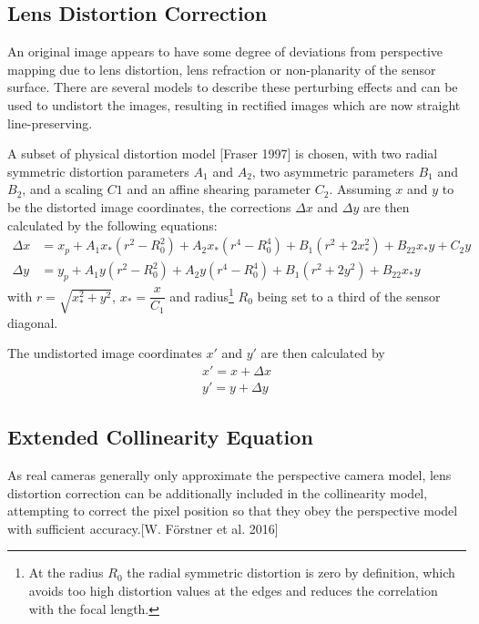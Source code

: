 \subsection{Lens Distortion Correction}
\label{subsec:LensDistortion}

An original image appears to have some degree of deviations from perspective mapping due to lens distortion, lens refraction or non-planarity of the sensor surface. There are several models to describe these perturbing effects and can be used to undistort the images, resulting in rectified images which are now straight line-preserving.
 
A subset of physical distortion model [Fraser 1997] is chosen, with two radial symmetric distortion parameters $A_1$ and $A_2$, two asymmetric parameters $B_1$ and $B_2$, and a scaling $C1$ and an affine shearing parameter $C_2$. Assuming $x$ and $y$ to be the distorted image coordinates, the corrections $\Delta x$ and $\Delta y$ are then calculated by the following equations:
\begin{equation} \label{eq:LensDistortion}
\begin{split}
\Delta x &= x_p + A_1x_*(r^2-R_0^2) + A_2x_*(r^4-R_0^4) + B_1(r^2+2x_*^2) + B_22x_*y+C_2y \\
\Delta y &= y_p + A_1y  (r^2-R_0^2) + A_2y  (r^4-R_0^4) + B_1(r^2+2y^2)   + B_22x_*y
\end{split}
\end{equation}
with $r=\sqrt{x_*^2+y^2}$, $x_*=\dfrac{x}{C_1}$ and radius\footnote{At the radius $R_0$ the radial symmetric distortion is zero by definition, which avoids too high distortion values at the edges and reduces the correlation with the focal length.} $R_0$ being set %
to a third of the sensor diagonal.

The undistorted image coordinates $x\prime$ and $y\prime$ are then calculated by
\begin{equation} \label{eq:undistortedimgcoord}
\begin{split}
x\prime=x+\Delta x \\
y\prime=y+\Delta y
\end{split}
\end{equation}

\subsection{Extended Collinearity Equation}
\label{subsec:ExtendedCollinearity}
As real cameras generally only approximate the perspective camera model, lens distortion correction can be additionally included in the collinearity model, attempting to correct the pixel position so that they obey the perspective model with sufficient accuracy.[W. Förstner et al. 2016]%

